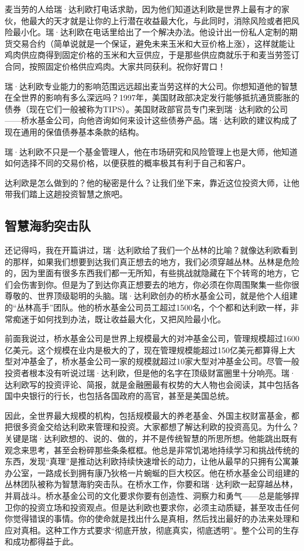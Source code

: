 麦当劳的人给瑞·达利欧打电话求助，因为他们知道达利欧是世界上最有才的家伙，他最大的天才就是让你的上行潜在收益最大化，与此同时，消除风险或者把风险最小化。瑞·达利欧在电话里给出了一个解决办法。他设计出一份私人定制的期货交易合约（简单说就是一个保证，避免未来玉米和大豆价格上涨），这样就能让鸡肉供应商得到固定价格的玉米和大豆供应，于是那些供应商就乐于和麦当劳签订合同，按照固定价格供应鸡肉。大家共同获利。祝你好胃口！

瑞·达利欧专业能力的影响范围远远超出麦当劳这样的大公司。你想知道他的智慧在全世界的影响有多么深远吗？1997年，美国财政部决定发行能够抵抗通货膨胀的债券（现在它们一般被称为TIPS）。美国财政部官员专门来到瑞·达利欧的公司——桥水基金公司，向他咨询如何来设计这些债券产品。瑞·达利欧的建议构成了现在通用的保值债券基本条款的结构。

瑞·达利欧不只是一个基金管理人，他在市场研究和风险管理上也是大师，他知道如何选择不同的交易价格，以便获胜的概率极其有利于自己和客户。

达利欧是怎么做到的？他的秘密是什么？让我们坐下来，靠近这位投资大师，让他带我们踏上这趟投资智慧之旅吧。

\subsection{智慧海豹突击队}

还记得吗，我在开篇讲过，瑞·达利欧给了我们一个丛林的比喻？就像达利欧看到的那样，如果我们想要到达我们真正想去的地方，我们必须穿越丛林。丛林是危险的，因为里面有很多东西我们都一无所知，有些挑战就隐藏在下个转弯的地方，它们会伤害到你。但是为了到达你真正想要去的地方，你必须在你周围聚集一些你很尊敬的、世界顶级聪明的头脑。瑞·达利欧创办的桥水基金公司，就是他个人组建的“丛林高手”团队。他的桥水基金公司员工超过1500名，个个都和达利欧一样，非常痴迷于如何找到办法，既让收益最大化，又把风险最小化。

前面我说过，桥水基金公司是世界上规模最大的对冲基金公司，管理规模超过1600亿美元。这个规模在业内是极大的了，现在管理规模能超过150亿美元都算得上大型对冲基金了，桥水基金公司一家的规模就超过10家大型对冲基金公司。尽管一般投资者根本没有听说过瑞·达利欧，但是他的名字在顶级财富圈里十分响亮。瑞·达利欧写的投资评论、简报，就是金融圈最有权势的大人物也会阅读，其中包括各国中央银行的行长，也包括各国政府的高官，甚至是美国总统。

因此，全世界最大规模的机构，包括规模最大的养老基金、外国主权财富基金，都把很多资金交给达利欧来管理和投资。大家都想了解达利欧的投资高见。为什么？关键是瑞·达利欧想的、说的、做的，并不是传统智慧的所思所想。他能跳出既有观念来思考，甚至会粉碎那些条条框框。他总是非常饥渴地持续学习和挑战传统的东西，发现“真理”是推动达利欧持续快速增长的动力，让他从最早的只拥有公寓兼办公室，一路成长到拥有康乃狄格一片蜿蜒的巨大校区。他在桥水基金公司组建的丛林团队被称为智慧海豹突击队。在桥水工作，你要和瑞·达利欧一起穿越丛林，并肩战斗。桥水基金公司的文化要求你要有创造性、洞察力和勇气——总是能够捍卫你的投资立场和投资观点。但是达利欧也要求你，必须主动质疑，甚至攻击任何你觉得错误的事情。你的使命就是找出什么是真相，然后找出最好的办法来处理和应对真相。这种工作方式要求“彻底开放，彻底真实，彻底透明”。整个公司的生存和成功都得益于此。

